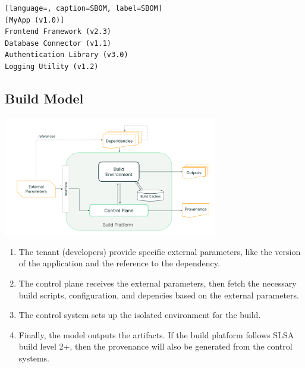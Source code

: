\begin{lstlisting}[language=, caption=SBOM, label=SBOM]
[MyApp (v1.0)]
Frontend Framework (v2.3)
Database Connector (v1.1)
Authentication Library (v3.0)
Logging Utility (v1.2)
\end{lstlisting}

\subsection{Build Model}
\includegraphics[width=0.7\textwidth]{./screenshot/build_model.png}
\begin{enumerate}
  \item The tenant (developers) provide specific external parameters, like the version of the application 
  and the reference to the dependency.
  \item The control plane receives the external parameters, then fetch the necessary build scripts, configuration,  
  and depencies based on the external parameters.
  \item The control system sets up the isolated environment for the build.
  \item Finally, the model outputs the artifacts. If the build platform follows SLSA build level 2+, then
  the provenance will also be generated from the control systems.
\end{enumerate}
